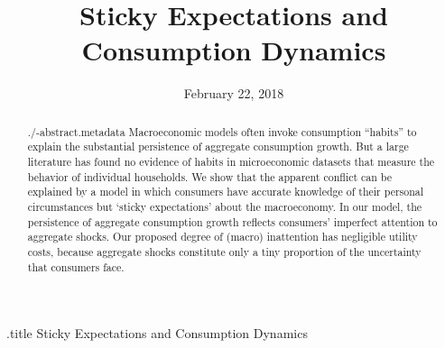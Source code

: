 \documentclass[titlepage]{\econtex}\newcommand{\texname}{cAndCwithStickyE}
\begin{document}




\begin{verbatimwrite}{\jobname.title}
Sticky Expectations and Consumption Dynamics
\end{verbatimwrite}

\hfill{\tiny \jobname}

\title{Sticky Expectations and \\ Consumption Dynamics}



\date{February 22, 2018}
\maketitle

\begin{abstract}
  \begin{verbatimwrite}{./\jobname-abstract.metadata} 
    Macroeconomic models often invoke consumption ``habits'' to explain the substantial persistence of aggregate consumption growth. But a large literature has found no evidence of habits in microeconomic datasets that measure the behavior of individual households.  We show that the apparent conflict can be explained by a model in which consumers have accurate knowledge of their personal circumstances but `sticky expectations' about the macroeconomy. In our model, the persistence of aggregate consumption growth reflects consumers' imperfect attention to aggregate shocks. Our proposed degree of (macro) inattention has negligible utility costs, because aggregate shocks constitute only a tiny proportion of the uncertainty that consumers face.  %
  \end{verbatimwrite}
  
\end{abstract}
\end{document}
